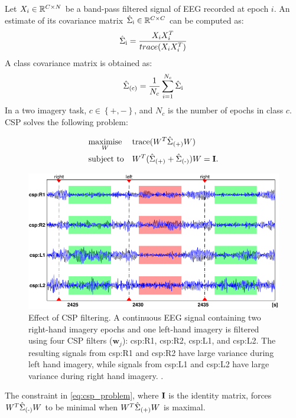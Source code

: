 Let $X_i \in \mathbb{R}^{C\times N}$ be a band-pass filtered signal of EEG recorded at epoch $i$.
An estimate of its covariance matrix $\hat{\Sigma}_{\operatorname{i}} \in \mathbb{R}^{C\times C}$ can be computed as:
\begin{equation}
\label{eq:covmat1}
\cov{i} = \frac{\X_i \X_i^{T}}{trace(\X_i \X_i^{T})} 
\end{equation} 
A class covariance matrix is obtained as: 
\begin{equation}
\hat{\Sigma}_{\operatorname{(c)}} = \frac{1}{N_c} \sum_{i=1}^{N_c} \hat{\Sigma}_{\operatorname{i}}
\end{equation}  
In a two imagery task, $c \in \left\lbrace +,- \right\rbrace$, and $N_c$ is the number of epochs in class $c$. 
\\CSP solves the following problem:

\begin{equation}
\label{eq:csp_problem}
\begin{aligned}
& \underset{W}{\text{maximise}}
& & \mathrm{trace}(W^T \cov{(+)} W) \\
& \text{subject to}
& & W^T(\cov{(+)} + \cov{(-)})W=\eye.
\end{aligned}
\end{equation} 
\begin{figure}[!th]
    \centering
    \includegraphics[width=0.8\columnwidth]{Figures/csp_effect}
    \caption{\footnotesize{Effect of CSP filtering. A continuous EEG signal containing two right-hand imagery epochs and one left-hand imagery is filtered using four CSP filters ($\mathbf{w}_j$): csp:R1, csp:R2, csp:L1, and csp:L2. The resulting signals from csp:R1 and csp:R2 have large variance during left hand imagery, while signals from csp:L1 and csp:L2 have large variance during right hand imagery. \citep[Image from][]{blankertz_optimizing_2008}.} }
    \label{fig:csp_effect}
\end{figure}
The constraint in \eqref{eq:csp_problem}, where $\mathbf{I}$ is the identity matrix, forces $W^T \hat{\Sigma}_{\operatorname{(-)}} W$ to be minimal when $W^T \hat{\Sigma}_{\operatorname{(+)}} W$ is maximal. 
